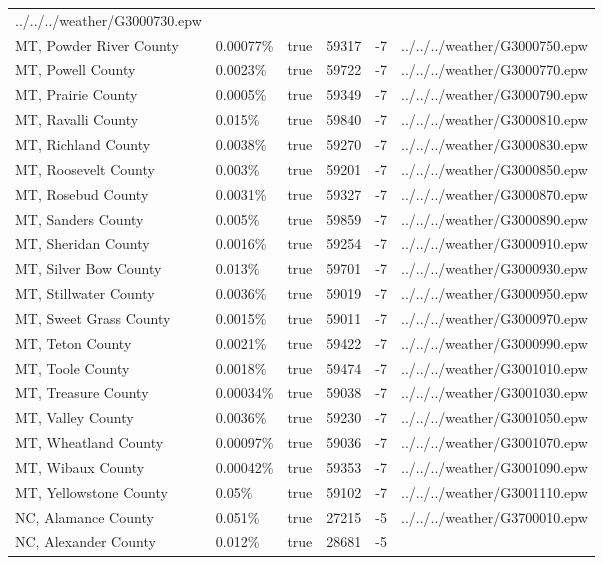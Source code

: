 \begin{longtable}[]{@{}llllll@{}}
../../../weather/G3000730.epw \\
MT, Powder River County & 0.00077\% & true & 59317 & -7 &
../../../weather/G3000750.epw \\
MT, Powell County & 0.0023\% & true & 59722 & -7 &
../../../weather/G3000770.epw \\
MT, Prairie County & 0.0005\% & true & 59349 & -7 &
../../../weather/G3000790.epw \\
MT, Ravalli County & 0.015\% & true & 59840 & -7 &
../../../weather/G3000810.epw \\
MT, Richland County & 0.0038\% & true & 59270 & -7 &
../../../weather/G3000830.epw \\
MT, Roosevelt County & 0.003\% & true & 59201 & -7 &
../../../weather/G3000850.epw \\
MT, Rosebud County & 0.0031\% & true & 59327 & -7 &
../../../weather/G3000870.epw \\
MT, Sanders County & 0.005\% & true & 59859 & -7 &
../../../weather/G3000890.epw \\
MT, Sheridan County & 0.0016\% & true & 59254 & -7 &
../../../weather/G3000910.epw \\
MT, Silver Bow County & 0.013\% & true & 59701 & -7 &
../../../weather/G3000930.epw \\
MT, Stillwater County & 0.0036\% & true & 59019 & -7 &
../../../weather/G3000950.epw \\
MT, Sweet Grass County & 0.0015\% & true & 59011 & -7 &
../../../weather/G3000970.epw \\
MT, Teton County & 0.0021\% & true & 59422 & -7 &
../../../weather/G3000990.epw \\
MT, Toole County & 0.0018\% & true & 59474 & -7 &
../../../weather/G3001010.epw \\
MT, Treasure County & 0.00034\% & true & 59038 & -7 &
../../../weather/G3001030.epw \\
MT, Valley County & 0.0036\% & true & 59230 & -7 &
../../../weather/G3001050.epw \\
MT, Wheatland County & 0.00097\% & true & 59036 & -7 &
../../../weather/G3001070.epw \\
MT, Wibaux County & 0.00042\% & true & 59353 & -7 &
../../../weather/G3001090.epw \\
MT, Yellowstone County & 0.05\% & true & 59102 & -7 &
../../../weather/G3001110.epw \\
NC, Alamance County & 0.051\% & true & 27215 & -5 &
../../../weather/G3700010.epw \\
NC, Alexander County & 0.012\% & true & 28681 & -5 &

\end{longtable}
